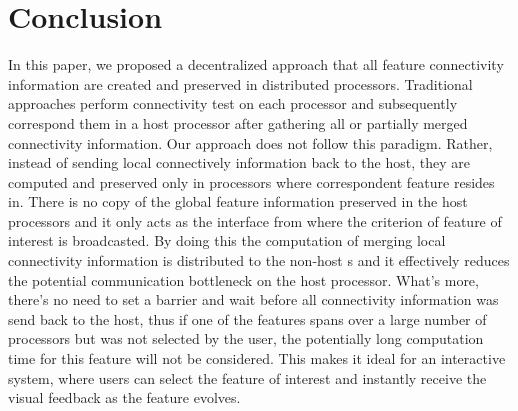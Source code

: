 \documentclass[10pt, conference, compsocconf]{IEEEtran}
\begin{document}
\section{Conclusion}
In this paper, we proposed a decentralized approach that all feature connectivity information are created and preserved in distributed processors. Traditional approaches perform connectivity test on each processor and subsequently correspond them in a host processor after gathering all or partially merged connectivity information. Our approach does not follow this paradigm. Rather, instead of sending local connectively information back to the host, they are computed and preserved only in processors where correspondent feature resides in. There is no copy of the global feature information preserved in the host processors and it only acts as the interface from where the criterion of feature of interest is broadcasted. By doing this the computation of merging local connectivity information is distributed to the non-host s and it effectively reduces the potential communication bottleneck on the host processor. What's more, there's no need to set a barrier and wait before all connectivity information was send back to the host, thus if one of the features spans over a large number of processors but was not selected by the user, the potentially long computation time for this feature will not be considered. This makes it ideal for an interactive system, where users can select the feature of interest and instantly receive the visual feedback as the feature evolves.

%
%
\end{document}
